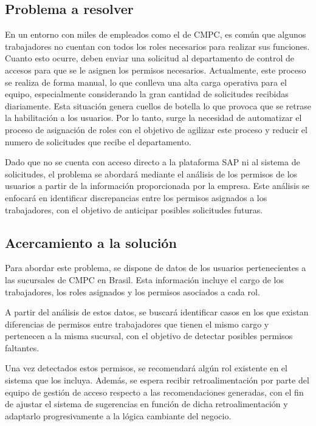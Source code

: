 \documentclass[11pt,letterpaper]{article}
\begin{document}
\subsection{Problema a resolver}
En un entorno con miles de empleados como el de CMPC, es común que algunos trabajadores no cuentan con todos los roles necesarios para realizar sus funciones. Cuanto esto ocurre, deben enviar una solicitud al departamento de control de accesos para que se le asignen los permisos necesarios.
Actualmente, este proceso se realiza de forma manual, lo que conlleva una alta carga operativa para el equipo, especialmente considerando la gran cantidad de solicitudes recibidas diariamente. Esta situación genera cuellos de botella lo que provoca que se retrase la habilitación a los usuarios. Por lo tanto, surge la necesidad de automatizar el proceso de asignación de roles con el objetivo de agilizar este proceso y reducir el numero de solicitudes que recibe el departamento.

Dado que no se cuenta con acceso directo a la plataforma SAP ni al sistema de solicitudes, el problema se abordará mediante el análisis de los permisos de los usuarios a partir de la información proporcionada por la empresa. Este análisis se enfocará en identificar discrepancias entre los permisos asignados a los trabajadores, con el objetivo de anticipar posibles solicitudes futuras.


\subsection{Acercamiento a la solución}

Para abordar este problema, se dispone de datos de los usuarios pertenecientes a las sucursales de CMPC en Brasil. Esta información incluye el cargo de los trabajadores, los roles asignados y los permisos asociados a cada rol.

A partir del análisis de estos datos, se buscará identificar casos en los que existan diferencias de permisos entre trabajadores que tienen el mismo cargo y pertenecen a la misma sucursal, con el objetivo de detectar posibles permisos faltantes.

Una vez detectados estos permisos, se recomendará algún rol existente en el sistema que los incluya. Además, se espera recibir retroalimentación por parte del equipo de gestión de acceso respecto a las recomendaciones generadas, con el fin de ajustar el sistema de sugerencias en función de dicha retroalimentación y adaptarlo progresivamente a la lógica cambiante del negocio.
\end{document}
